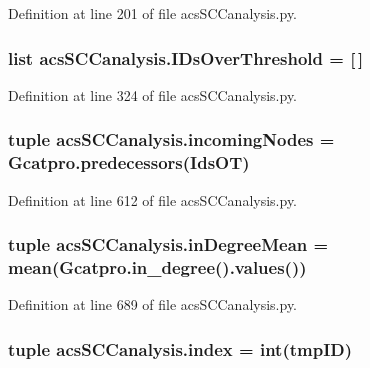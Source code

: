 Definition at line 201 of file acs\-S\-C\-Canalysis.\-py.

\hypertarget{a00128_a578f0f0f1e87579d73b11f8720610b1e}{
\subsubsection[{I\-Ds\-Over\-Threshold}]{\setlength{\rightskip}{0pt plus 5cm}list acs\-S\-C\-Canalysis.\-I\-Ds\-Over\-Threshold = \mbox{[}$\,$\mbox{]}}}\label{a00128_a578f0f0f1e87579d73b11f8720610b1e}


Definition at line 324 of file acs\-S\-C\-Canalysis.\-py.

\hypertarget{a00128_a540ba5319ee67d8a2323099dad73ba36}{
\subsubsection[{incoming\-Nodes}]{\setlength{\rightskip}{0pt plus 5cm}tuple acs\-S\-C\-Canalysis.\-incoming\-Nodes = Gcatpro.\-predecessors(Ids\-O\-T)}}\label{a00128_a540ba5319ee67d8a2323099dad73ba36}


Definition at line 612 of file acs\-S\-C\-Canalysis.\-py.

\hypertarget{a00128_a5004d18b8cfa2803620a9cd7f32d9775}{
\subsubsection[{in\-Degree\-Mean}]{\setlength{\rightskip}{0pt plus 5cm}tuple acs\-S\-C\-Canalysis.\-in\-Degree\-Mean = mean(Gcatpro.\-in\-\_\-degree().values())}}\label{a00128_a5004d18b8cfa2803620a9cd7f32d9775}


Definition at line 689 of file acs\-S\-C\-Canalysis.\-py.

\hypertarget{a00128_aaac3bb67a998c4a09aeed8f1adec2f9c}{
\subsubsection[{index}]{\setlength{\rightskip}{0pt plus 5cm}tuple acs\-S\-C\-Canalysis.\-index = int(tmp\-I\-D)}}\label{a00128_aaac3bb67a998c4a09aeed8f1adec2f9c}


